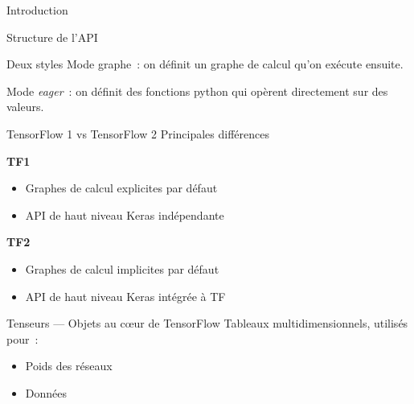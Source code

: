 \begin{frame}{Introduction}
\end{frame}

\begin{frame}{Structure de l'API}
  \centering
\end{frame}

\begin{frame}{Deux styles}
  Mode graphe~: on définit un graphe de calcul qu'on exécute ensuite.

  Mode \textit{eager}~: on définit des fonctions python qui opèrent directement sur des valeurs.
\end{frame}

\begin{frame}{TensorFlow 1 vs TensorFlow 2}
  \centering
  Principales différences

  \begin{minipage}[l]{0.5\linewidth}
    \centering
    \textbf{TF1}
    \begin{itemize}[<+->]
      \item Graphes de calcul explicites par défaut
      \item API de haut niveau Keras indépendante
    \end{itemize}
  \end{minipage}\hfill
  \begin{minipage}[l]{0.49\linewidth}
    \setcounter{beamerpauses}{1}
    \centering
    \textbf{TF2}
    \begin{itemize}[<+->]
      \item Graphes de calcul implicites par défaut
      \item API de haut niveau Keras intégrée à TF
    \end{itemize}
  \end{minipage}\hfill
\end{frame}

\begin{frame}{Tenseurs --- Objets au cœur de TensorFlow}
  Tableaux multidimensionnels, utilisés pour~:

  \begin{itemize}[<+->]
    \item Poids des réseaux
    \item Données
  \end{itemize}

\end{frame}

